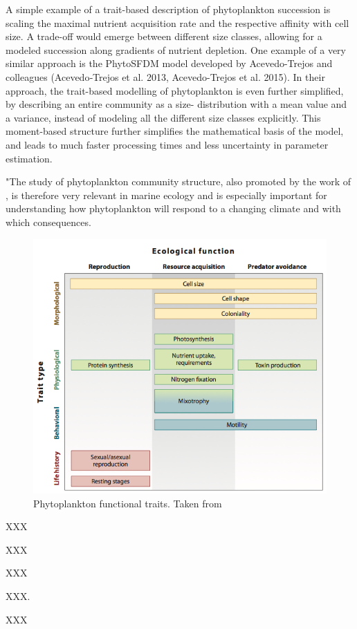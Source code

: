 A simple example of a trait-based description of phytoplankton succession is scaling the maximal nutrient acquisition rate and the respective affinity with cell size. A trade-off would emerge between different size classes, allowing for a modeled succession along gradients of nutrient depletion. One example of a very similar approach is the PhytoSFDM model developed by Acevedo-Trejos and colleagues (Acevedo‐Trejos et al. 2013, Acevedo-Trejos et al. 2015). In their approach, the trait-based modelling of phytoplankton is even further simplified, by describing an entire community as a size- distribution with a mean value and a variance, instead of modeling all the different size classes explicitly. This moment-based structure further simplifies the mathematical basis of the model, and leads to much faster processing times and less uncertainty in parameter estimation.

"The study of phytoplankton community structure, also promoted by the work of \citet{Falkowski1998}, is therefore very relevant in marine ecology and is especially important for understanding how phytoplankton will respond to a changing climate and with which consequences.



\begin{figure}
\centering
\includegraphics[width=0.7\linewidth]{./Chp1-Intro/Fig_litchman2008.png}
\caption[Scheme]{\small{Phytoplankton functional traits. Taken from \citet{Litchman2008}}}
\label{phytotrait}
\end{figure}

XXX

XXX

XXX

XXX. 

XXX


